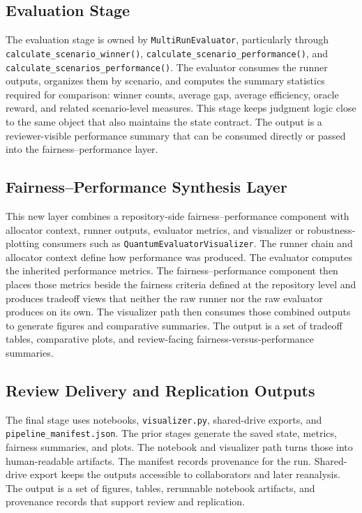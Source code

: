 \documentclass{IEEEtran}
\begin{document}
\subsection{Evaluation Stage}
The evaluation stage is owned by \texttt{MultiRunEvaluator}, particularly through \texttt{calculate\_scenario\_winner()}, \texttt{calculate\_scenario\_performance()}, and \texttt{calculate\_scenarios\_performance()}. The evaluator consumes the runner outputs, organizes them by scenario, and computes the summary statistics required for comparison: winner counts, average gap, average efficiency, oracle reward, and related scenario-level measures. This stage keeps judgment logic close to the same object that also maintains the state contract. The output is a reviewer-visible performance summary that can be consumed directly or passed into the fairness--performance layer.

\subsection{Fairness--Performance Synthesis Layer}
This new layer combines a repository-side fairness--performance component with allocator context, runner outputs, evaluator metrics, and visualizer or robustness-plotting consumers such as \texttt{QuantumEvaluatorVisualizer}. The runner chain and allocator context define how performance was produced. The evaluator computes the inherited performance metrics. The fairness--performance component then places those metrics beside the fairness criteria defined at the repository level and produces tradeoff views that neither the raw runner nor the raw evaluator produces on its own. The visualizer path then consumes those combined outputs to generate figures and comparative summaries. The output is a set of tradeoff tables, comparative plots, and review-facing fairness-versus-performance summaries.

\subsection{Review Delivery and Replication Outputs}
The final stage uses notebooks, \texttt{visualizer.py}, shared-drive exports, and \texttt{pipeline\_manifest.json}.
The prior stages generate the saved state, metrics, fairness summaries, and plots. The notebook and visualizer path turns those into human-readable artifacts. The manifest records provenance for the run. Shared-drive export keeps the outputs accessible to collaborators and later
reanalysis. The output is a set of figures, tables, rerunnable notebook artifacts, and provenance records that support review and replication.
\end{document}
